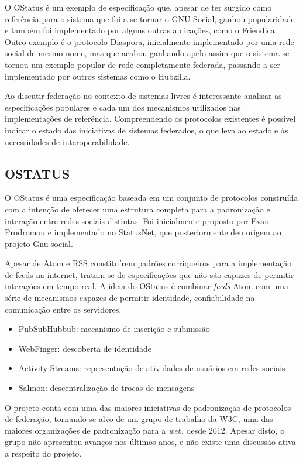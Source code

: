 O OStatus é um exemplo de especificação que, apesar de ter surgido como referência
para o sistema que foi a se tornar o GNU Social, ganhou popularidade e também foi
implementado por alguns outras aplicações, como o Friendica. Outro exemplo é o
protocolo Diaspora, inicialmente implementado por uma rede social de mesmo nome, mas
que acabou ganhando apelo assim que o sistema se tornou um exemplo popular de rede
completamente federada, passando a ser implementado por outros sistemas como o
Hubzilla.

Ao discutir federação no contexto de sistemas livres é interessante analisar as
especificações populares e cada um dos mecanismos utilizados nas implementações de
referência. Compreendendo os protocolos existentes é possível indicar o estado das
iniciativas de sistemas federados, o que leva ao estado e às necessidades de
interoperabilidade.

\subsection{OSTATUS}

O OStatus é uma especificação baseada em um conjunto de protocolos construída com a
intenção de oferecer uma estrutura completa para a padronização e interação entre
redes sociais distintas. Foi inicialmente proposto por Evan Prodromou e implementado
no StatusNet, que posteriormente deu origem ao projeto Gnu social.

Apesar de Atom e RSS constituírem padrões corriqueiros para a implementação de feeds
na internet, tratam-se de especificações que não são capazes de permitir interações
em tempo real. A ideia do OStatus é combinar \textit{feeds} Atom com uma série de
mecanismos capazes de permitir identidade, confiabilidade na comunicação entre os
servidores.

\begin{itemize}
  \item{PubSubHubbub: mecanismo de inscrição e submissão}
  \item{WebFinger: descoberta de identidade}
  \item{Activity Streams: representação de atividades de usuários em redes sociais}
  \item{Salmon: descentralização de trocas de mensagens}
\end{itemize}

O projeto conta com uma das maiores iniciativas de padronização de protocolos de
federação, tornando-se alvo de um grupo de trabalho da W3C, uma das maiores
organizações de padronização para a \textit{web}, desde 2012. Apesar disto, o grupo
não apresentou avanços nos últimos anos, e não existe uma discussão ativa a respeito
do projeto.


